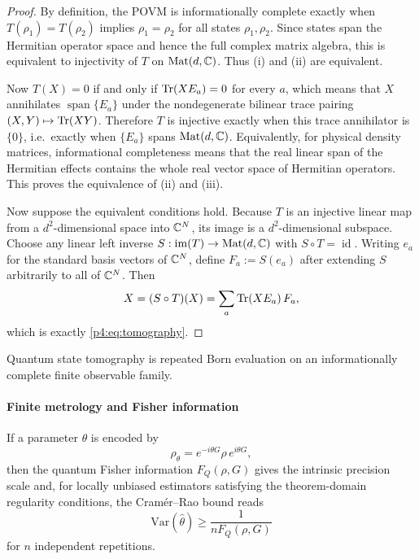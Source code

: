 \documentclass[12pt,a4paper]{article}
\begin{document}
\begin{proof}
By definition, the POVM is informationally complete exactly when \(T(\rho_1)=T(\rho_2)\) implies \(\rho_1=\rho_2\) for all states \(\rho_1,\rho_2\).
Since states span the Hermitian operator space and hence the full complex matrix algebra, this is equivalent to injectivity of \(T\) on \(\mathrm{Mat}(d,\mathbb{C})\).
Thus (i) and (ii) are equivalent.

Now \(T(X)=0\) if and only if \(\operatorname{Tr}(XE_a)=0\) for every \(a\), which means that \(X\) annihilates \(\operatorname{span}\{E_a\}\) under the nondegenerate bilinear trace pairing \((X,Y)\mapsto\operatorname{Tr}(XY)\).
Therefore \(T\) is injective exactly when this trace annihilator is \(\{0\}\), i.e.\ exactly when \(\{E_a\}\) spans \(\mathrm{Mat}(d,\mathbb{C})\).  Equivalently, for physical density matrices, informational completeness means that the real linear span of the Hermitian effects contains the whole real vector space of Hermitian operators.
This proves the equivalence of (ii) and (iii).

Now suppose the equivalent conditions hold.
Because \(T\) is an injective linear map from a \(d^2\)-dimensional space into \(\mathbb{C}^N\), its image is a \(d^2\)-dimensional subspace.
Choose any linear left inverse \(S:\operatorname{im}(T)\to \mathrm{Mat}(d,\mathbb{C})\) with \(S\circ T=\operatorname{id}\).
Writing \(e_a\) for the standard basis vectors of \(\mathbb{C}^N\), define \(F_a:=S(e_a)\) after extending \(S\) arbitrarily to all of \(\mathbb{C}^N\).
Then
\[
X=(S\circ T)(X)=\sum_a \operatorname{Tr}(XE_a)\,F_a,
\]
which is exactly \eqref{p4:eq:tomography}.
\end{proof}

Quantum state tomography is repeated Born evaluation on an informationally complete finite observable family.



\paragraph{Finite metrology and Fisher information}
\label{p4:sec:part3-metrology}

If a parameter $\theta$ is encoded by
\begin{equation}
\label{p4:eq:param-encoding}
\rho_{\theta}=e^{-i\theta G}\rho\,e^{i\theta G},
\end{equation}
then the quantum Fisher information $F_Q(\rho,G)$ gives the intrinsic precision scale and, for locally unbiased estimators satisfying the theorem-domain regularity conditions, the Cram\'er--Rao bound reads \cite{Helstrom1976,Holevo1982,BraunsteinCaves1994}
\begin{equation}
\label{p4:eq:qcrb}
\mathrm{Var}(\widehat\theta)\ge \frac{1}{nF_Q(\rho,G)}
\end{equation}
for $n$ independent repetitions.
\end{document}
